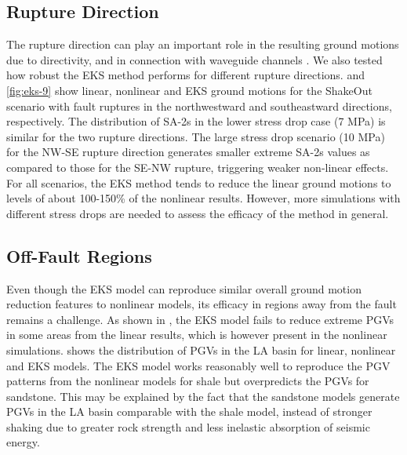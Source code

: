 \subsection{Rupture Direction}
The rupture direction can play an important role in the resulting ground motions due to directivity, and in connection with waveguide channels . We also tested how robust the EKS method performs for different rupture directions.  and \ref{fig:eks-9} show linear, nonlinear and EKS ground motions for the ShakeOut scenario with fault ruptures in the  northwestward and southeastward directions, respectively. The distribution of SA-2s in the lower stress drop case (7 MPa) is similar for the two rupture directions. The large stress drop scenario (10 MPa) for the NW-SE rupture direction generates smaller extreme SA-2s values as compared to those for the SE-NW rupture, triggering weaker non-linear effects. For all scenarios, the EKS method tends to reduce the linear ground motions to levels of about 100-150\% of the nonlinear results. However, more simulations with different stress drops are needed to assess the efficacy of the method in general.

\subsection{Off-Fault Regions}

Even though the EKS model can reproduce similar overall ground motion reduction features to nonlinear models, its efficacy in regions away from the fault remains a challenge. As shown in , the EKS model fails to reduce extreme PGVs in some areas from the linear results, which is however present in the nonlinear simulations.  shows the distribution of PGVs in the LA basin for linear, nonlinear and EKS models. The EKS model works reasonably well to reproduce the PGV patterns from the nonlinear models for shale but overpredicts the PGVs for sandstone. This may be explained by the fact that the sandstone models generate PGVs in the LA basin comparable with the shale model, instead of stronger shaking due to greater rock strength and less inelastic absorption of seismic energy.


